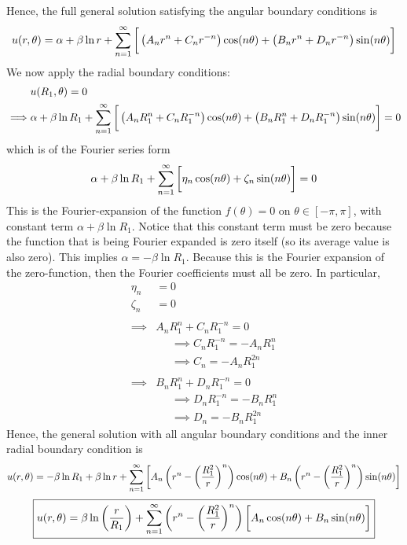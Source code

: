 \documentclass[12pt]{article}
\begin{document}
{Hence, the full general solution satisfying the angular boundary conditions is 
$$u(r,\theta) = \alpha + \beta \ln r + \sum_{n=1}^{\infty} \left[ \vphantom{\frac{1}{1}} \left( A_n r^n + C_n r^{-n} \right) \cos(n\theta) + \left( B_n r^n + D_n r^{-n} \right) \sin(n\theta) \right]$$
We now apply the radial boundary conditions:
\begin{align*}
& u(R_1, \theta) = 0 \\
\implies& \alpha + \beta \ln R_1 + \sum_{n=1}^{\infty} \left[ \vphantom{\frac{1}{1}} \left( A_n R_1^n + C_n R_1^{-n} \right) \cos(n\theta) + \left( B_n R_1^n + D_n R_1^{-n} \right) \sin(n\theta) \right] = 0
\end{align*}
which is of the Fourier series form
$$\alpha + \beta \ln R_1 + \sum_{n=1}^{\infty} \left[ \vphantom{\frac{1}{1}} \eta_n \cos(n\theta) +\zeta_n \sin(n\theta) \right] = 0$$
This is the Fourier-expansion of the function $f(\theta) = 0$ on $\theta \in [-\pi, \pi]$, with constant term $\alpha + \beta \ln R_1$. Notice that this constant term must be zero because the function that is being Fourier expanded is zero itself (so its average value is also zero). This implies $\boxed{\alpha = -\beta \ln R_1}$.
Because this is the Fourier expansion of the zero-function, then the Fourier coefficients must all be zero. In particular,
\begin{align*}
\eta_n &= 0\\
\zeta_n &= 0 \\ \\
\implies& A_n R_1^n + C_n R_1^{-n}  = 0 \\
& \;\;\;\;\; \implies C_n R_1^{-n} = -A_n R_1^n \\
& \;\;\;\;\; \implies C_n = -A_n R_1^{2n} \\ \\
\implies& B_n R_1^n + D_n R_1^{-n} = 0 \\
& \;\;\;\;\; \implies D_n R_1^{-n} = - B_n R_1^n \\
& \;\;\;\;\; \implies D_n = - B_n R_1^{2n} 
\end{align*}
Hence, the general solution with all angular boundary conditions and the inner radial boundary condition is
$$u(r,\theta) = -\beta \ln R_1 + \beta \ln r + \sum_{n=1}^{\infty} \left[ \vphantom{\frac{1}{1}} A_n \left( r^n - \left( \frac{R_1^2}{r} \right)^n \right) \cos(n\theta) + B_n \left( r^n - \left( \frac{R_1^2}{r} \right)^n \right) \sin(n\theta) \right]$$
$$\boxed{u(r,\theta) = \beta \ln \left( \frac{r}{R_1} \right) + \sum_{n=1}^{\infty} \left( r^n - \left( \frac{R_1^2}{r} \right)^n \right) \left[ \vphantom{\frac{1}{1}}   A_n \cos(n\theta) + B_n \sin(n\theta) \right]}$$ \\
}
\end{document}
